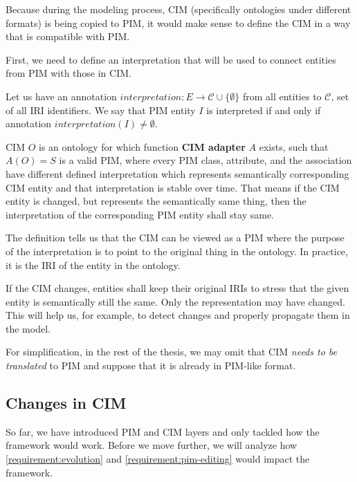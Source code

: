 \bigskip

Because during the modeling process, CIM (specifically ontologies under different formats) is being copied to PIM, it would make sense to define the CIM in a way that is compatible with PIM.

First, we need to define an interpretation that will be used to connect entities from PIM with those in CIM.

\begin{definition}[interpretation]
    Let us have an annotation $interpretation: E \rightarrow \mathcal{C} \cup \{\emptyset\}$ from all entities to $\mathcal{C}$, set of all IRI identifiers. We say that PIM entity $I$ is interpreted if and only if annotation $interpretation(I) \neq \emptyset$.
\end{definition}

\begin{definition}[CIM]
    CIM $O$ is an ontology for which function \textbf{CIM adapter} $A$ exists, such that $A(O) = S$ is a valid PIM, where every PIM class, attribute, and the association have different defined interpretation which represents semantically corresponding CIM entity and that interpretation is stable over time. That means if the CIM entity is changed, but represents the semantically same thing, then the interpretation of the corresponding PIM entity shall stay same.
\end{definition}

The definition tells us that the CIM can be viewed as a PIM where the purpose of the interpretation is to point to the original thing in the ontology. In practice, it is the IRI of the entity in the ontology.

If the CIM changes, entities shall keep their original IRIs to stress that the given entity is semantically still the same. Only the representation may have changed. This will help us, for example, to detect changes and properly propagate them in the model.

For simplification, in the rest of the thesis, we may omit that CIM \textit{needs to be translated} to PIM and suppose that it is already in PIM-like format.

\subsection{Changes in CIM}

So far, we have introduced PIM and CIM layers and only tackled how the framework would work. Before we move further, we will analyze how \autoref{requirement:evolution} and \ref{requirement:pim-editing} would impact the framework.

